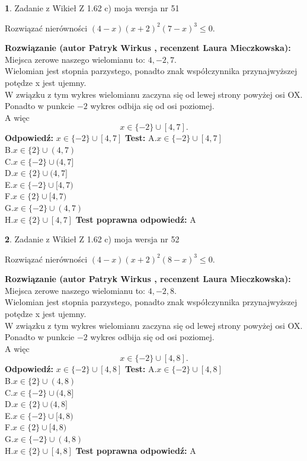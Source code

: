 \documentclass[12pt, a4paper]{article}
\theoremstyle{definition} %
\newtheorem{zad}{}
\newcommand{\zadStart}[1]{\begin{zad}#1\newline}
\newcommand{\zadStop}{\end{zad}}
\newcommand{\rozwStart}[2]{\noindent \textbf{Rozwiązanie (autor #1 , recenzent #2): }\newline}
\newcommand{\rozwStop}{\newline}
\newcommand{\odpStart}{\noindent \textbf{Odpowiedź:}\newline}
\newcommand{\odpStop}{\newline}
\newcommand{\testStart}{\noindent \textbf{Test:}\newline}
\newcommand{\testStop}{\newline}
\newcommand{\kluczStart}{\noindent \textbf{Test poprawna odpowiedź:}\newline}
\newcommand{\kluczStop}{\newline}
\begin{document}
\zadStart{Zadanie z Wikieł Z 1.62 c) moja wersja nr 51}

Rozwiązać nierówności $(4-x)(x+2)^{2}(7-x)^{3}\le0$.
\zadStop
\rozwStart{Patryk Wirkus}{Laura Mieczkowska}
Miejsca zerowe naszego wielomianu to: $4, -2, 7$.\\
Wielomian jest stopnia parzystego, ponadto znak współczynnika przy\linebreak najwyższej potędze x jest ujemny.\\ W związku z tym wykres wielomianu zaczyna się od lewej strony powyżej osi OX.\\
Ponadto w punkcie $-2$ wykres odbija się od osi poziomej.\\
A więc $$x \in \{-2\} \cup [4,7].$$
\rozwStop
\odpStart
$x \in \{-2\} \cup [4,7]$
\odpStop
\testStart
A.$x \in \{-2\} \cup [4,7]$\\
B.$x \in \{2\} \cup (4,7)$\\
C.$x \in \{-2\} \cup (4,7]$\\
D.$x \in \{2\} \cup (4,7]$\\
E.$x \in \{-2\} \cup [4,7)$\\
F.$x \in \{2\} \cup [4,7)$\\
G.$x \in \{-2\} \cup (4,7)$\\
H.$x \in \{2\} \cup [4,7]$
\testStop
\kluczStart
A
\kluczStop



\zadStart{Zadanie z Wikieł Z 1.62 c) moja wersja nr 52}

Rozwiązać nierówności $(4-x)(x+2)^{2}(8-x)^{3}\le0$.
\zadStop
\rozwStart{Patryk Wirkus}{Laura Mieczkowska}
Miejsca zerowe naszego wielomianu to: $4, -2, 8$.\\
Wielomian jest stopnia parzystego, ponadto znak współczynnika przy\linebreak najwyższej potędze x jest ujemny.\\ W związku z tym wykres wielomianu zaczyna się od lewej strony powyżej osi OX.\\
Ponadto w punkcie $-2$ wykres odbija się od osi poziomej.\\
A więc $$x \in \{-2\} \cup [4,8].$$
\rozwStop
\odpStart
$x \in \{-2\} \cup [4,8]$
\odpStop
\testStart
A.$x \in \{-2\} \cup [4,8]$\\
B.$x \in \{2\} \cup (4,8)$\\
C.$x \in \{-2\} \cup (4,8]$\\
D.$x \in \{2\} \cup (4,8]$\\
E.$x \in \{-2\} \cup [4,8)$\\
F.$x \in \{2\} \cup [4,8)$\\
G.$x \in \{-2\} \cup (4,8)$\\
H.$x \in \{2\} \cup [4,8]$
\testStop
\kluczStart
A
\kluczStop
\end{document}

